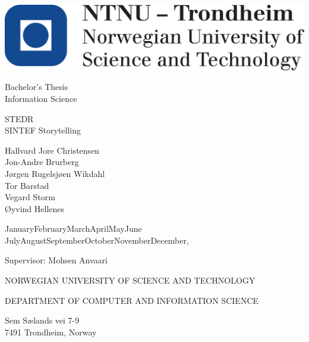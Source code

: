 
\begin{titlepage}
  \begin{center}
    \includegraphics[scale=0.5]{res/logo_ntnu_eng.png}
    
    \vspace{1cm}
    
    {\large Bachelor's Thesis}\\[1mm]
    {\large Information Science}
    
    \vspace{1cm}
    
    {\huge STEDR\\[1ex]
     SINTEF Storytelling}
    
    \vspace{1cm}
    
    {\large Hallvard Jore Christensen}\\
    {\large Jon-Andre Brurberg}\\
    {\large Jørgen Rugelsjøen Wikdahl}\\
    {\large Tor Barstad}\\
    {\large Vegard Storm}\\
    {\large Øyvind Hellenes}\\
    
    \vspace{\fill}
    
    {\large
      \ifcase\month\or
      January\or February\or March\or April\or May\or June\or
      July\or August\or September\or October\or November\or December\fi,
      \number\year
    }
    
    \vspace{\fill}
    
    Supervisor: Mohsen Anvaari
    
    \vspace{0.3cm}
    
    \vspace{\fill}
    
    NORWEGIAN UNIVERSITY OF SCIENCE AND TECHNOLOGY
    
    DEPARTMENT OF COMPUTER AND INFORMATION SCIENCE
    
    \vspace{.5cm}
    
   Sem Sælands vei 7-9\\
   
   7491 Trondheim, Norway
    
  \end{center}
\end{titlepage}

